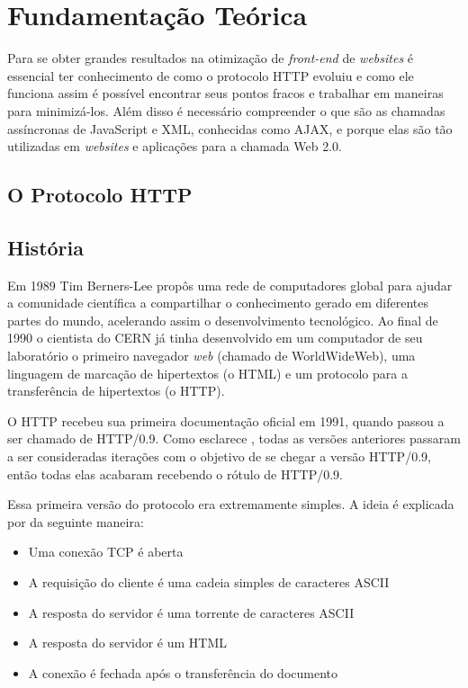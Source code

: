 %
%

\chapter{Fundamentação Teórica}
\label{chap:fundamentacaoTeorica}

Para se obter grandes resultados na otimização de \textit{front-end} de \textit{websites} é essencial ter conhecimento de como o protocolo HTTP evoluiu e como ele funciona assim é possível encontrar seus pontos fracos e trabalhar em maneiras para minimizá-los. Além disso é necessário compreender o que são as chamadas assíncronas de JavaScript e XML, conhecidas como AJAX, e porque elas são tão utilizadas em \textit{websites} e aplicações para a chamada Web 2.0.

\section{O Protocolo HTTP}
\label{sec:http}

\section{História}
\label{sec:http_historia}

Em 1989 Tim Berners-Lee propôs uma rede de computadores global para ajudar a comunidade científica a compartilhar o conhecimento gerado em diferentes partes do mundo, acelerando assim o desenvolvimento tecnológico. Ao final de 1990 o cientista do CERN já tinha desenvolvido em um computador de seu laboratório o primeiro navegador \textit{web} (chamado de WorldWideWeb), uma linguagem de marcação de hipertextos (o HTML) e um protocolo para a transferência de hipertextos (o HTTP).

O HTTP recebeu sua primeira documentação oficial em 1991, quando passou a ser chamado de HTTP/0.9. Como esclarece \cite{HighPerformanceBrowserNetworking}, todas as versões anteriores passaram a ser consideradas iterações com o objetivo de se chegar a versão HTTP/0.9, então todas elas acabaram recebendo o rótulo de HTTP/0.9.

Essa primeira versão do protocolo era extremamente simples. A ideia é explicada por \cite{HighPerformanceBrowserNetworking} da seguinte maneira:

\begin{itemize}
	\item Uma conexão TCP é aberta
	\item A requisição do cliente é uma cadeia simples de caracteres ASCII
	\item A resposta do servidor é uma torrente de caracteres ASCII
	\item A resposta do servidor é um HTML
	\item A conexão é fechada após o transferência do documento 
\end{itemize}

